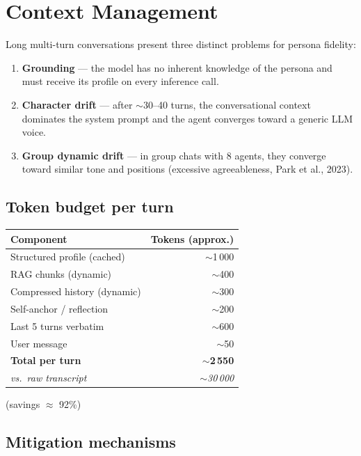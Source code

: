 \documentclass[12pt,a4paper]{article}
\begin{document}
\section{Context Management}

Long multi-turn conversations present three distinct problems for persona fidelity:

\begin{enumerate}
  \item \textbf{Grounding} --- the model has no inherent knowledge of the persona and must
        receive its profile on every inference call.
  \item \textbf{Character drift} --- after $\sim$30--40 turns, the conversational context
        dominates the system prompt and the agent converges toward a generic LLM voice.
  \item \textbf{Group dynamic drift} --- in group chats with 8 agents, they converge toward
        similar tone and positions (excessive agreeableness, Park et al., 2023).
\end{enumerate}

\subsection{Token budget per turn}

\begin{tabular}{@{}lr@{}}
\toprule
\textbf{Component} & \textbf{Tokens (approx.)} \\
\midrule
Structured profile (cached)   & $\sim$1\,000 \\
RAG chunks (dynamic)          & $\sim$400 \\
Compressed history (dynamic)  & $\sim$300 \\
Self-anchor / reflection      & $\sim$200 \\
Last 5 turns verbatim         & $\sim$600 \\
User message                  & $\sim$50 \\
\midrule
\textbf{Total per turn}       & \textbf{$\sim$2\,550} \\
\emph{vs.\ raw transcript}    & \emph{$\sim$30\,000} \\
\bottomrule
\end{tabular}\quad (savings $\approx$ 92\%)

\subsection{Mitigation mechanisms}
\end{document}
